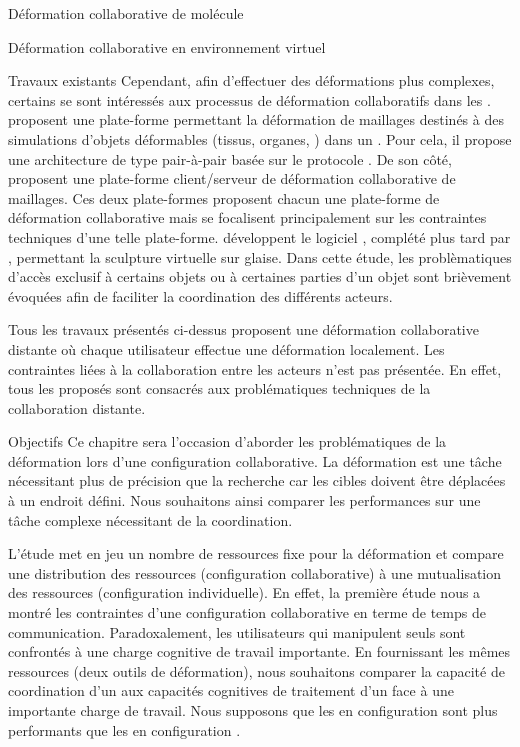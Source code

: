\documentclass[myfrancais,ngerman,english,frenchb]{mythesis}
\begin{document}
\begin{mychapter}{Déformation collaborative de molécule}
\begin{mysection}{Déformation collaborative en environnement virtuel}
\begin{mysubsection}{Travaux existants}
				Cependant, afin d'effectuer des déformations plus complexes, certains se sont intéressés aux processus de déformation collaboratifs dans les .
				 proposent une plate-forme permettant la déformation de maillages destinés à des simulations d'objets déformables (tissus, organes, \myetc) dans un .
				Pour cela, il propose une architecture de type pair-à-pair basée sur le protocole .
				De son côté,  proposent une plate-forme client/serveur de déformation collaborative de maillages.
				Ces deux plate-formes proposent chacun une plate-forme de déformation collaborative mais se focalisent principalement sur les contraintes techniques d'une telle plate-forme.
				 développent le logiciel \myClayWorks, complété plus tard par , permettant la sculpture virtuelle sur glaise.
				Dans cette étude, les problèmatiques d'accès exclusif à certains objets ou à certaines parties d'un objet sont brièvement évoquées afin de faciliter la coordination des différents acteurs.

				Tous les travaux présentés ci-dessus proposent une déformation collaborative distante où chaque utilisateur effectue une déformation localement.
				Les contraintes liées à la collaboration entre les acteurs n'est pas présentée.
				En effet, tous les  proposés sont consacrés aux problématiques techniques de la collaboration distante.
			\end{mysubsection}
			\begin{mysubsection}{Objectifs}
				Ce chapitre sera l'occasion d'aborder les problématiques de la déformation lors d'une configuration collaborative.
				La déformation est une tâche nécessitant plus de précision que la recherche car les cibles doivent être déplacées à un endroit défini.
				Nous souhaitons ainsi comparer les performances sur une tâche complexe nécessitant de la coordination.

				L'étude met en jeu un nombre de ressources fixe pour la déformation et compare une distribution des ressources (configuration collaborative) à une mutualisation des ressources (configuration individuelle).
				En effet, la première étude nous a montré les contraintes d'une configuration collaborative en terme de temps de communication.
				Paradoxalement, les utilisateurs qui manipulent seuls sont confrontés à une charge cognitive de travail importante.
				En fournissant les mêmes ressources (deux outils de déformation), nous souhaitons comparer la capacité de coordination d'un  aux capacités cognitives de traitement d'un  face à une importante charge de travail.
				Nous supposons que les  en configuration  sont plus performants que les  en configuration .


\end{mysubsection}
\end{mysection}
\end{mychapter}
\end{document}
